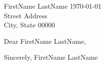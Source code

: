 \documentclass[11pt,a4paper,sans]{letter} %
\begin{document}
FirstName LastName \hfill \today \\ %
Street Address \\ %
City, State 00000 %

\bigbreak

Dear FirstName LastName, %

\bigbreak %

\blindtext %

\blindtext %

\bigbreak %
Sincerely,
\bigbreak %
FirstName LastName %
\end{document}
